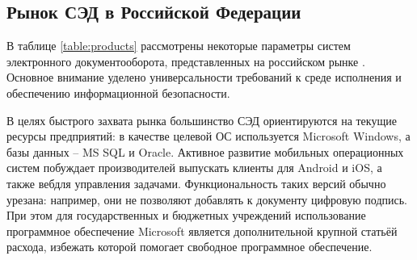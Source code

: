 \subsection{Рынок СЭД в Российской Федерации} \label{review_products}

В таблице \ref{table:products} рассмотрены некоторые параметры систем электронного документооборота, представленных на российском рынке \cite{ixbt, evfrat}. Основное внимание уделено универсальности требований к среде исполнения и обеспечению информационной безопасности.

\vspace{\baselineskip}
В целях быстрого захвата рынка большинство СЭД ориентируются на текущие ресурсы предприятий: в качестве целевой ОС используется Microsoft Windows, а базы данных – MS SQL и Oracle. Активное развитие мобильных операционных систем побуждает производителей выпускать клиенты для Android и iOS, а также веб для управления задачами. Функциональность таких версий обычно урезана: например, они не позволяют добавлять к документу цифровую подпись. При этом для государственных и бюджетных учреждений использование программное обеспечение Microsoft является дополнительной крупной статьёй расхода, избежать которой помогает свободное программное обеспечение.

